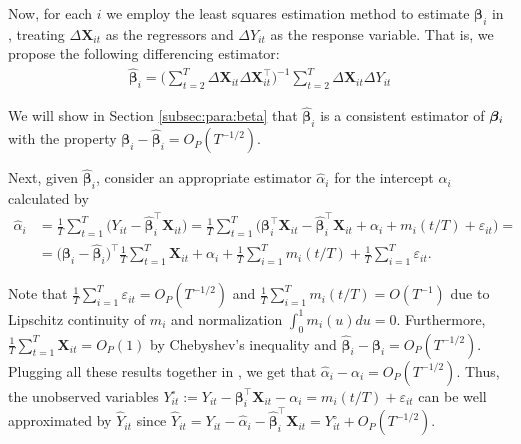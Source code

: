 \documentclass[a4paper,12pt]{article}
\makeatletter
\renewcommand{\eqref}[1]{\tagform@{\ref{#1}}}
\makeatother
\begin{document}
Now, for each $i$ we employ the least squares estimation method to estimate $\bm{\beta}_i$ in \eqref{model_with_regs}, treating $\Delta \mathbf{X}_{it}$ as the regressors and $\Delta Y_{it}$ as the response variable. That is, we propose the following differencing estimator:
\begin{align}\label{eq:beta:est}
\widehat{\bm{\beta}}_i = \Big( \sum_{t=2}^T \Delta \mathbf{X}_{it} \Delta \mathbf{X}_{it}^\top \Big)^{-1} \sum_{t=2}^T \Delta \mathbf{X}_{it} \Delta Y_{it}
\end{align}

We will show in Section \ref{subsec:para:beta} that $\widehat{\bm{\beta}}_i$ is a consistent estimator of $\bm{\beta}_i$ with the property $\bm{\beta}_i - \widehat{\bm{\beta}}_i = O_P(T^{-1/2})$.

Next, given $\widehat{\bm{\beta}}_i$, consider an appropriate estimator $\widehat{\alpha}_{i}$ for the intercept $\alpha_i$ calculated by
\begin{align}\label{alpha-est}
\widehat{\alpha}_i &= \frac{1}{T}\sum_{t=1}^T \big(Y_{it} - \widehat{\bm{\beta}}_i^\top \mathbf{X}_{it}\big) = \frac{1}{T}\sum_{t=1}^T \big(\bm{\beta}_i^\top \mathbf{X}_{it} - \widehat{\bm{\beta}}_i^\top \mathbf{X}_{it} + \alpha_i + m_i(t/T) + \varepsilon_{it}\big) =\\
&= \big(\bm{\beta}_i - \widehat{\bm{\beta}}_i \big)^\top\frac{1}{T}\sum_{t=1}^T  \mathbf{X}_{it} + \alpha_i + \frac{1}{T}\sum_{i=1}^T m_i(t/T) + \frac{1}{T}\sum_{i=1}^T \varepsilon_{it}.\nonumber
\end{align}

Note that $\frac{1}{T}\sum_{i=1}^T \varepsilon_{it} = O_P(T^{-1/2})$ and $\frac{1}{T}\sum_{i=1}^T m_i(t/T) = O(T^{-1})$ due to Lipschitz continuity of $m_i$ and normalization $\int_{0}^1 m_i(u)du = 0$. Furthermore, $\frac{1}{T}\sum_{t=1}^T  \mathbf{X}_{it} = O_P(1)$ by Chebyshev's inequality and $\widehat{\bm{\beta}}_i - \bm{\beta}_i = O_P (T^{-1/2})$. Plugging all these results together in \eqref{alpha-est}, we get that $\widehat{\alpha}_i - \alpha_i = O_P(T^{-1/2})$. Thus, the unobserved variables \linebreak $Y_{it}^\circ := Y_{it} - \bm{\beta}_i^\top \mathbf{X}_{it} - \alpha_i = m_i(t/T) + \varepsilon_{it}$ can be well approximated by $\widehat{Y}_{it} $ since $\widehat{Y}_{it} = Y_{it} -\widehat{\alpha}_i - \widehat{\bm{\beta}}_i^\top \mathbf{X}_{it} = Y_{it}^\circ + O_P(T^{-1/2})$.
\end{document}
